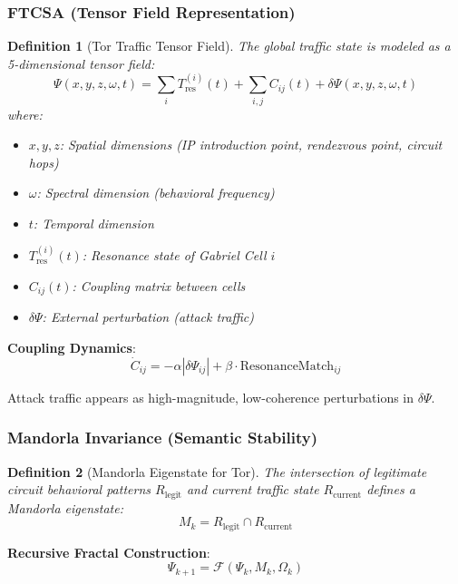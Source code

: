 \documentclass[11pt,a4paper]{article}
\newtheorem{definition}{Definition}[section]
\begin{document}
\subsubsection{FTCSA (Tensor Field Representation)}

\begin{definition}[Tor Traffic Tensor Field]
The global traffic state is modeled as a 5-dimensional tensor field:
\begin{equation}
\Psi(x, y, z, \omega, t) = \sum_i T_{\text{res}}^{(i)}(t) + \sum_{i,j} C_{ij}(t) + \delta \Psi(x,y,z,\omega,t)
\end{equation}
where:
\begin{itemize}
\item $x, y, z$: Spatial dimensions (IP introduction point, rendezvous point, circuit hops)
\item $\omega$: Spectral dimension (behavioral frequency)
\item $t$: Temporal dimension
\item $T_{\text{res}}^{(i)}(t)$: Resonance state of Gabriel Cell $i$
\item $C_{ij}(t)$: Coupling matrix between cells
\item $\delta\Psi$: External perturbation (attack traffic)
\end{itemize}
\end{definition}

\textbf{Coupling Dynamics}:
\begin{equation}
\dot{C}_{ij} = -\alpha |\delta \Psi_{ij}| + \beta \cdot \text{ResonanceMatch}_{ij}
\end{equation}

Attack traffic appears as high-magnitude, low-coherence perturbations in $\delta\Psi$.

\subsubsection{Mandorla Invariance (Semantic Stability)}

\begin{definition}[Mandorla Eigenstate for Tor]
The intersection of legitimate circuit behavioral patterns $R_{\text{legit}}$ and current traffic state $R_{\text{current}}$ defines a Mandorla eigenstate:
\begin{equation}
M_k = R_{\text{legit}} \cap R_{\text{current}}
\end{equation}
\end{definition}

\textbf{Recursive Fractal Construction}:
\begin{equation}
\Psi_{k+1} = \mathcal{F}(\Psi_k, M_k, \Omega_k)
\end{equation}
\end{document}
